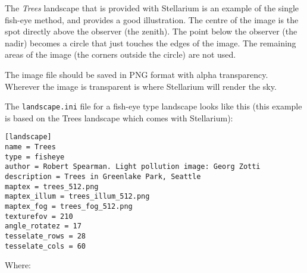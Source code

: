 The \emph{Trees} landscape that is provided with Stellarium is an
example of the single fish-eye method, and provides a good illustration.
The centre of the image is the spot directly above the observer (the
zenith). The point below the observer (the nadir) becomes a circle that
just touches the edges of the image. The remaining areas of the image
(the corners outside the circle) are not used.

The image file should be saved in PNG format with alpha transparency.
Wherever the image is transparent is where Stellarium will render the
sky.

The \texttt{landscape.ini} file for a fish-eye type landscape looks like
this (this example is based on the Trees landscape which comes with
Stellarium):

\begin{config}
\texttt{{[}landscape{]}}\\
\texttt{name~=~Trees}\\
\texttt{type~=~fisheye}\\
\texttt{author~=~Robert~Spearman.~Light~pollution~image:~Georg~Zotti}\\
\texttt{description~=~Trees~in~Greenlake~Park,~Seattle}\\
\texttt{maptex~=~trees\_512.png}\\
\texttt{maptex\_illum~=~trees\_illum\_512.png}\\
\texttt{maptex\_fog~=~trees\_fog\_512.png}\\
\texttt{texturefov~=~210}\\
\texttt{angle\_rotatez~=~17}\\
\texttt{tesselate\_rows~=~28}\\
\texttt{tesselate\_cols~=~60}
\end{config}

Where:


